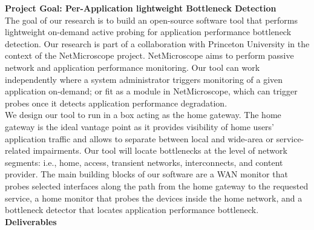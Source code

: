 \documentclass[11 pt]{article}
\begin{document}
\newpage

\noindent \textbf{Project Goal: Per-Application lightweight Bottleneck Detection}\\

The goal of our research is to build an open-source software tool that performs lightweight on-demand active probing for application performance bottleneck detection. Our research is part of a collaboration with Princeton University in the context of the NetMicroscope project. NetMicroscope aims to perform passive network and application performance monitoring. Our tool can work independently where a system administrator triggers monitoring of a given  application on-demand; or fit as a module in NetMicroscope, which can trigger probes once it detects application performance degradation.\\

We design our tool to run in a box acting as the home gateway. The home gateway is the ideal vantage point as it provides visibility of home users' application traffic and allows to separate between local and wide-area or service-related impairments. Our tool will locate bottlenecks at the level of network segments: i.e., home, access, transient networks, interconnects, and content provider. The main building blocks of our software are a WAN monitor that probes selected interfaces along the path from the home gateway to the requested service, a home monitor that probes the devices inside the home network, and a bottleneck detector that locates application performance bottleneck.\\

\textbf{Deliverables}
\end{document}
